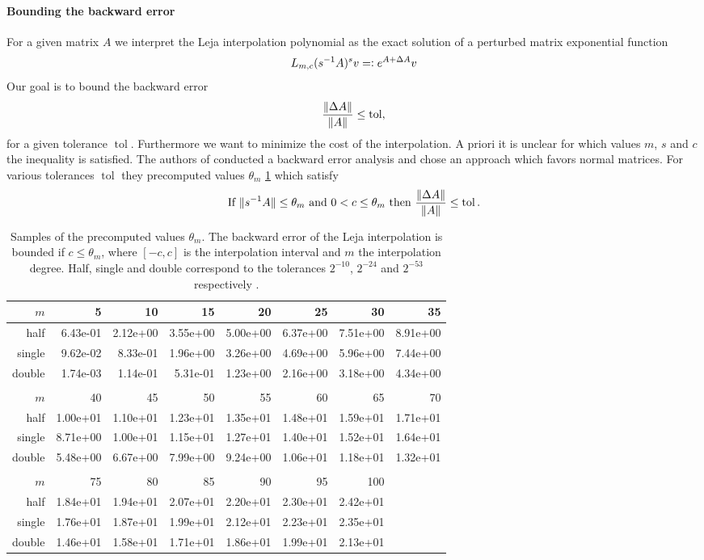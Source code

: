 \documentclass{scrartcl}
\newcommand{\eqdefn}{=\mathrel{\mathop:}}
\begin{document}
\paragraph{Bounding the backward error} For a given matrix $A$ we interpret the Leja interpolation polynomial as the exact solution of a perturbed matrix exponential function
\[
L_{m,c}(s^{-1}A)^sv \eqdefn e^{A + \Delta A}v\\
\]
Our goal is to bound the backward error 
\[
\frac{\lVert\Delta A\rVert}{\lVert A\rVert} \le \operatorname{tol}, 
\]
for a given tolerance $\operatorname{tol}$. Furthermore we want to minimize the cost of the interpolation. A priori it is unclear for which values $m$, $s$ and $c$ the inequality is satisfied. The authors of \cite{lejarev} conducted a backward error analysis and chose an approach which favors normal matrices. For various tolerances $\operatorname{tol}$ they precomputed values $\theta_m$ \ref{table:thetam} which satisfy
\[
\text{If}\ \norm{s^{-1}A}\le \theta_m\ \text{and}\ 0 < c \le \theta_m\ \text{then}\ \frac{\norm{\Delta A}}{\norm{A}} \le \operatorname{tol}.
\]
\begin{table}[tbp]
	\begin{tabular}{r|rrrrrrr}
		$m$ &        5 &       10 &       15 &       20 &       25 &       30 &       35 \\\hline
		half & 6.43e-01 & 2.12e+00 & 3.55e+00 & 5.00e+00 & 6.37e+00 & 7.51e+00 & 8.91e+00 \\
		single & 9.62e-02 & 8.33e-01 & 1.96e+00 & 3.26e+00 & 4.69e+00 & 5.96e+00 & 7.44e+00 \\
		double & 1.74e-03 & 1.14e-01 & 5.31e-01 & 1.23e+00 & 2.16e+00 & 3.18e+00 & 4.34e+00 \\
		\\
		$m$ &       40 &       45 &       50 &       55 &       60 &       65 &       70 \\\hline
		half & 1.00e+01 & 1.10e+01 & 1.23e+01 & 1.35e+01 & 1.48e+01 & 1.59e+01 & 1.71e+01 \\
		single & 8.71e+00 & 1.00e+01 & 1.15e+01 & 1.27e+01 & 1.40e+01 & 1.52e+01 & 1.64e+01 \\
		double & 5.48e+00 & 6.67e+00 & 7.99e+00 & 9.24e+00 & 1.06e+01 & 1.18e+01 & 1.32e+01 \\
		\\
		$m$ &       75 &       80 &       85 &       90 &       95 &      100 \\ \hline
		half & 1.84e+01 & 1.94e+01 & 2.07e+01 & 2.20e+01 & 2.30e+01 & 2.42e+01 \\
		single & 1.76e+01 & 1.87e+01 & 1.99e+01 & 2.12e+01 & 2.23e+01 & 2.35e+01 \\
		double & 1.46e+01 & 1.58e+01 & 1.71e+01 & 1.86e+01 & 1.99e+01 & 2.13e+01
	\end{tabular}
	\caption{Samples of the precomputed values $\theta_m$. The backward error of the Leja interpolation is bounded if $c\le\theta_m$, where $[-c,c]$ is the interpolation interval and $m$ the interpolation degree. Half, single and double correspond to the tolerances $2^{-10}$, $2^{-24}$ and $2^{-53}$ respectively \cite[Table 1]{lejarev}.}
	\label{table:thetam}
\end{table}	
\end{document}

